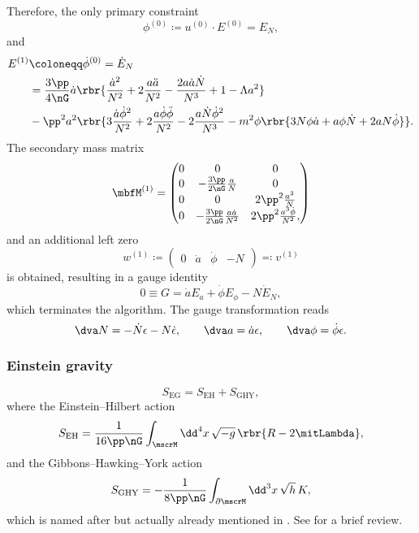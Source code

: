 \documentclass[a4paper,11pt]{article}
\begin{document}
Therefore, the only primary constraint
\begin{equation}
\phi^{(0)} \coloneqq u^{(0)}\cdot E^{(0)} = E_N,
\end{equation}
and
\begin{align}
E^{(1)} &\coloneqq \dot{\phi}^{(0)} = \dot{E}_N \\
&= \frac{3\pp}{4\nG}\dot{a} 
\rbr{\frac{\dot{a}^2}{N^2}+2\frac{a\ddot{a}}{N^2} 
-\frac{2a\dot{a}\dot{N}}{N^3}+1-\Lambda a^2}\nonumber \\
&- \pp^2 a^2
\rbr{3\frac{\dot{a}\dot{\phi}^2}{N^2} +2\frac{a\dot{\phi}\ddot{\phi}}{N^2}
-2\frac{a\dot{N}\dot{\phi}^2}{N^3}-m^2\phi
\rbr{3N\phi\dot{a}+a\phi\dot{N}+2aN\dot{\phi}}}.
\end{align}
The secondary mass matrix
\begin{equation}
\mbfM^{(1)} = \begin{pmatrix}
0 & 0 & 0 \\ 0 & -\frac{3\pp}{2\nG}\frac{a}{N} & 0 \\
0 & 0 & 2\pp^2\frac{a^3}{N} \\
0 & -\frac{3\pp}{2\nG}\frac{a\dot{a}}{N^2} & 2\pp^2\frac{a^3\dot{\phi}}{N^2},
\end{pmatrix}
\end{equation}
and an additional left zero
\begin{equation}
w^{(1)} \coloneqq \begin{pmatrix}
0 & \dot{a} & \dot{\phi} & -N
\end{pmatrix}
\eqqcolon v^{(1)}
\end{equation}
is obtained, resulting in a gauge identity
\begin{equation}
0 \equiv G = \dot{a} E_a + \dot{\phi} E_\phi - N\dot{E}_N,
\end{equation}
which terminates the algorithm. The gauge transformation reads
\begin{equation}
\dva N = -\dot{N}\epsilon - N\dot{\epsilon},\qquad
\dva a = \dot{a}\epsilon,\qquad \dva \phi = \dot{\phi}\epsilon.
\end{equation}







\subsubsection{Einstein gravity}

\begin{equation}
S_\text{EG} = S_\text{EH} + S_\text{GHY},
\label{eq:action-einstein-gravity}
\end{equation}
where the Einstein--Hilbert action
\begin{equation}
S_\text{EH} = \frac{1}{16\pp\nG}\int_\mscrM\dd^4 x\,\sqrt{-g}\, 
\rbr{R-2\mitLambda},
\end{equation}
and the Gibbons--Hawking--York action
\begin{equation}
S_\text{GHY} = -\frac{1}{8\pp\nG}\int_{\partial\mscrM}\dd^3 x\,\sqrt{h}\, K,
\end{equation}
which is named after \cite{Gibbons1977,York1972} but actually already
mentioned in \cite{Einstein1916}. See \cite{Dyer2009} for a brief review.



\printbibliography
\end{document}
